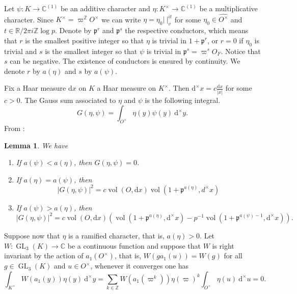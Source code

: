 \documentclass[a4paper,11pt]{amsart}
\newtheorem{lemma}[theorem]{Lemma}
\theoremstyle{definition}
\newcommand{\R}{\mathbb{R}}
\newcommand{\Z}{\mathbb{Z}}
\newcommand{\gelle}{\operatorname{GL}}
\newcommand{\CC}{\mathbb{C}}
\begin{document}
Let $\psi \colon K \to \mathbb{C}^{(1)}$ be an additive character and  $\eta \colon K^{\times}\to \mathbb{C}^{(1)}$ be a  multiplicative character. Since $K^{\times} = \varpi^{\Z}O^{\times}$ we can write $\eta = \eta_0\vert{\ }\vert_v^{it}$ for some $\eta_0 \in \widehat{O^{\times}}$ and $t \in \R/2\pi i \Z \log p.$ Denote by $\mathfrak{p}^{r}$ and $\mathfrak{p}^{s}$ the respective conductors, which means that $r$ is the smallest positive integer so that $\eta$ is trivial in $1+\mathfrak{p}^{r}$, or $r=0$ if $\eta_0$ is trivial and $s$ is the smallest integer so that $\psi$ is trivial in $\mathfrak{p}^{s} = \varpi^s O_F$. Notice that $s$ can be negative. The existence of conductors is ensured by continuity. We denote $r$ by $a(\eta)$ and $s$ by $a(\psi)$.

Fix a Haar measure $\mathrm{d}x$ on $K$ a Haar measure on $K^{\times}$. Then $\mathrm{d}^{\times}{x} = c\frac{\mathrm{d}x}{\vert{x}\vert}$ for some $c>0$. The Gauss sum associated to $\eta$ and $\psi$ is the following integral.
\begin{equation*}
    G(\eta,\psi) = \int_{O^{\times}}\eta(y)\psi(y)\ \mathrm{d}^{\times}y.
\end{equation*}
From \cite[7-4 Lemma]{fourieranalysisnumberfields}:
\begin{lemma}\label{lem:gausssum}We have
    \begin{enumerate}
        \item If $a(\psi)<a(\eta)$, then $G(\eta,\psi) = 0$.
        \item If $a(\eta)=a(\psi)$, then \[\vert{G(\eta,\psi)}\vert^2 = c\operatorname{vol}(O,\mathrm{d}x)\operatorname{vol}(1+\mathfrak{p}^{a(\eta)},d^\times x)\]
        \item If $a(\psi)>a(\eta)$, then \[\vert{G(\eta,\psi)}\vert^2 = c\operatorname{vol}(O,\mathrm{d}x)\left(\operatorname{vol}(1+\mathfrak{p}^{a(\eta)},\mathrm{d}^\times x)-p^{-1}\operatorname{vol}(1+\mathfrak{p}^{a(\psi)-1},\mathrm{d}^\times x)\right).\]
    \end{enumerate}
    
\end{lemma}



Suppose now that $\eta$ is a ramified character, that is, $a(\eta)>0$.
Let $W \colon \gelle_3(K) \to \CC$ be a continuous function and suppose that $W$ is right invariant by the action of $a_1(O^\times)$, that is, $W\left(ga_1(u)\right) = W(g)$ for all $g\in \gelle_3(K)$ and $u\in O^{\times}$, whenever it converges one has 
\begin{equation*}\label{eq:local0newform}\int_{K^{\times}}W(a_1(y))\eta(y) \ \mathrm{d}^{\times}y = \sum_{k\in \Z}W(a_1(\varpi^k))\eta(\varpi)^k\int_{O^{\times}}\eta(u) \ \mathrm{d}^{\times}u= 0. 
\end{equation*}
\end{document}
